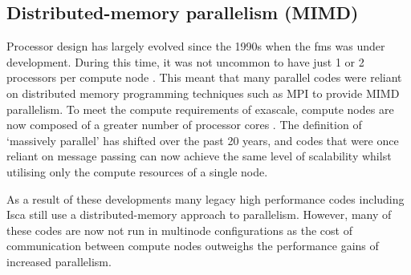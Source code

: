 \documentclass[a4paper,11pt]{report}
\begin{document}
\subsection{Distributed-memory parallelism (MIMD)}
Processor design has largely evolved since the 1990s when the \gls{fms} was under development. During this time, it was not uncommon to have just 1 or 2 processors per compute node \cite{becker1995beowulf}. This meant that many parallel codes were reliant on distributed memory programming techniques such as MPI to provide MIMD parallelism. To meet the compute requirements of exascale, compute nodes are now composed of a greater number of processor cores \cite{beowulf14reed, bergman2008exascale}. The definition of `massively parallel' has shifted over the past 20 years, and codes that were once reliant on message passing can now achieve the same level of scalability whilst utilising only the compute resources of a single node. 
\par
As a result of these developments many legacy high performance codes including Isca still use a distributed-memory approach to parallelism. However, many of these codes are now not run in multinode configurations as the cost of communication between compute nodes outweighs the performance gains of increased parallelism. 
\end{document}
